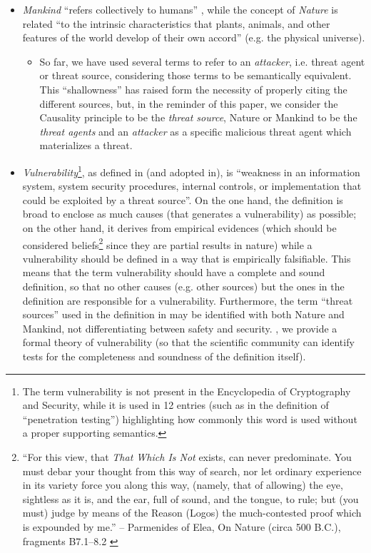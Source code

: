 \begin{itemize}
	\item \emph{Mankind} ``refers collectively to humans''
\autocite{wiki-mankind}, while the concept of \emph{Nature} is
		related ``to the intrinsic characteristics that plants,
		animals, and other features of the world develop of their own
		accord'' (e.g. the physical universe)\autocite{wiki-nature}. 
		\begin{itemize}
			\item So far, we have used several terms to refer to an
				\emph{attacker}, i.e. threat agent or threat source,
				considering those terms to be semantically
				equivalent.  This ``shallowness'' has raised form the
				necessity of properly citing the different sources, but,
				in the reminder of this paper, we consider the
				Causality principle to be the \emph{threat
				source}, Nature or Mankind to be the
				\emph{threat agents} and an \emph{attacker} as
				a specific malicious threat agent which materializes a
				threat.
		\end{itemize}
	\item \emph{Vulnerability}\footnote{The term vulnerability is not
		present in the Encyclopedia of Cryptography and Security, while
		it is used in 12 entries (such as in the definition of
		``penetration testing''\autocite{caddy2005pentest})
		highlighting how commonly this word is used without a proper
		supporting semantics.}, as defined in\autocite{cnssi20104009}
		(and adopted in\autocite{nist2013800-53}), is ``weakness in an
		information system, system security procedures, internal
		controls, or implementation that could be exploited by a threat
		source''. On the one hand, the definition is broad to enclose
		as much causes (that generates a vulnerability) as possible; on
		the other hand, it derives from empirical evidences (which
		should be considered beliefs\footnote{``For this view, that
		\emph{That Which Is Not} exists, can never predominate. You
		must debar your thought from this way of search, nor let
		ordinary experience in its variety force you along this way,
		(namely, that of allowing) the eye, sightless as it is, and the
		ear, full of sound, and the tongue, to rule; but (you must)
		judge by means of the Reason (Logos) the much-contested proof
		which is expounded by me.'' -- Parmenides of Elea, On Nature
		(circa 500 B.C.), fragments B7.1–8.2
		\autocite{Hakim2016philosophy}} since they are partial results in nature) 
		while a vulnerability should
		be defined in a way that is empirically falsifiable. This means
		that the term vulnerability should have a complete and sound
		definition, so that no other causes (e.g.  other sources) but
		the ones in the definition are responsible for a vulnerability.
		Furthermore, the term ``threat sources'' used in the definition
		in\autocite{cnssi20104009} may be identified with both Nature
		and Mankind, not differentiating between safety and security.
		, we provide a formal
		theory of vulnerability (so that the scientific community can
		identify tests for the completeness and soundness of the
		definition itself).
\end{itemize}

